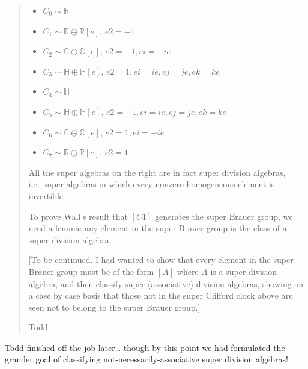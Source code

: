 \documentclass{article}
\def\tightlist{}
\begin{document}
\begin{quote}
\begin{itemize}
\tightlist
\item
  \(C_0 \sim \mathbb{R}\)
\item
  \(C_1 \sim \mathbb{R}\oplus\mathbb{R}[e]\), \(e2 = -1\)
\item
  \(C_2 \sim \mathbb{C}\oplus\mathbb{C}[e]\), \(e2 = -1, ei = -ie\)
\item
  \(C_3 \sim \mathbb{H}\oplus\mathbb{H}[e]\),
  \(e2 = 1, ei = ie, ej = je, ek = ke\)
\item
  \(C_4 \sim \mathbb{H}\)
\item
  \(C_5 \sim \mathbb{H}\oplus\mathbb{H}[e]\),
  \(e2 = -1, ei = ie, ej = je, ek = ke\)
\item
  \(C_6 \sim \mathbb{C}\oplus\mathbb{C}[e]\), \(e2 = 1, ei = -ie\)
\item
  \(C_7 \sim \mathbb{R}\oplus\mathbb{R}[e]\), \(e2 = 1\)
\end{itemize}

All the super algebras on the right are in fact super division algebras,
i.e.~super algebras in which every nonzero homogeneous element is
invertible.

To prove Wall's result that \([C1]\) generates the super Brauer group,
we need a lemma: any element in the super Brauer group is the class of a
super division algebra.

{[}To be continued. I had wanted to show that every element in the super
Brauer group must be of the form \([A]\) where \(A\) is a super division
algebra, and then classify super (associative) division algebras,
showing on a case by case basis that those not in the super Clifford
clock above are seen not to belong to the super Brauer group.{]}

Todd
\end{quote}

Todd finished off the job later\ldots{} though by this point we had
formulated the grander goal of classifying not-necessarily-associative
super division algebras!
\end{document}

